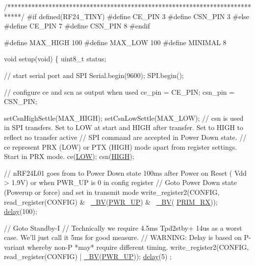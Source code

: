 \begin{DoxyCodeInclude}
\textcolor{comment}{/****************************************************************************/}
\textcolor{preprocessor}{#if defined(RF24\_TINY)}
\textcolor{preprocessor}{#define CE\_PIN   3}
\textcolor{preprocessor}{#define CSN\_PIN  3}
\textcolor{preprocessor}{#else}
\textcolor{preprocessor}{#define CE\_PIN   7}
\textcolor{preprocessor}{#define CSN\_PIN  8}
\textcolor{preprocessor}{#endif}

\textcolor{preprocessor}{#define MAX\_HIGH    100}
\textcolor{preprocessor}{#define MAX\_LOW     100}
\textcolor{preprocessor}{#define MINIMAL     8}

\textcolor{keywordtype}{void} setup(\textcolor{keywordtype}{void}) \{
  uint8\_t status;

  \textcolor{comment}{// start serial port and SPI}
  Serial.begin(9600);
  SPI.begin();

  \textcolor{comment}{// configure ce and scn as output when used}
  ce\_pin = CE\_PIN;
  csn\_pin = CSN\_PIN;

  setCsnHighSettle(MAX\_HIGH);
  setCsnLowSettle(MAX\_LOW);
  \textcolor{comment}{// csn is used in SPI transfers. Set to LOW at start and HIGH after transfer. Set to HIGH to reflect no
       transfer active}
  \textcolor{comment}{// SPI command are accepted in Power Down state.}
  \textcolor{comment}{// ce represent PRX (LOW) or PTX (HIGH) mode apart from register settings. Start in PRX mode.  }
  ce(\hyperlink{group__Porting__General_gab811d8c6ff3a505312d3276590444289}{LOW});
  csn(\hyperlink{group__Porting__General_ga5bb885982ff66a2e0a0a45a8ee9c35e2}{HIGH});

  \textcolor{comment}{// nRF24L01 goes from to Power Down state 100ms after Power on Reset ( Vdd > 1.9V) or when PWR\_UP is 0 in
       config register }
  \textcolor{comment}{// Goto Power Down state (Powerup or force) and set in transmit mode}
  write\_register2(CONFIG, read\_register(CONFIG) & ~\hyperlink{group__Porting__General_ga483c9de27db573099572f5485ef841c9}{\_BV}(\hyperlink{nRF24L01_8h_af0dbd9e4c17ba0db357fcb2cedd4aa6d}{PWR\_UP}) & ~\hyperlink{group__Porting__General_ga483c9de27db573099572f5485ef841c9}{\_BV}(
      \hyperlink{nRF24L01_8h_a0b4d92f3ecccb150d4cb1cb5d0f9d4e6}{PRIM\_RX}));
  \hyperlink{group__Porting__General_ga70a331e8ddf9acf9d33c47b71cda4c5f}{delay}(100);
  
  \textcolor{comment}{// Goto Standby-I}
  \textcolor{comment}{// Technically we require 4.5ms Tpd2stby+ 14us as a worst case. We'll just call it 5ms for good measure.}
  \textcolor{comment}{// WARNING: Delay is based on P-variant whereby non-P *may* require different timing.}
  write\_register2(CONFIG, read\_register(CONFIG) | \hyperlink{group__Porting__General_ga483c9de27db573099572f5485ef841c9}{\_BV}(\hyperlink{nRF24L01_8h_af0dbd9e4c17ba0db357fcb2cedd4aa6d}{PWR\_UP}));
  \hyperlink{group__Porting__General_ga70a331e8ddf9acf9d33c47b71cda4c5f}{delay}(5) ;


\end{DoxyCodeInclude}
